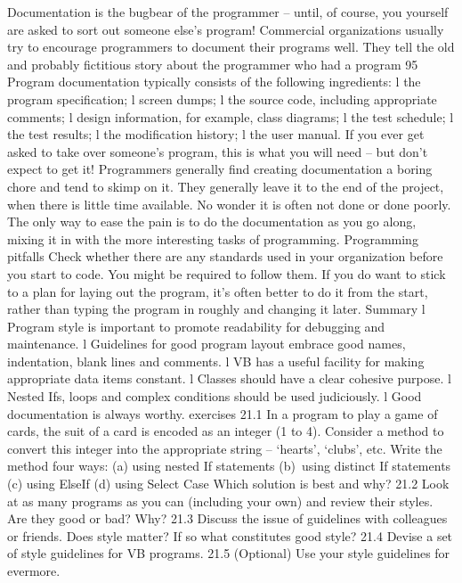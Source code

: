 Documentation is the bugbear of the programmer – until, of course, you yourself are asked to sort out someone else’s program! Commercial organizations usually try to encourage programmers to document their programs well. They tell the old and probably ﬁctitious story about the programmer who had a program 95%
Program documentation typically consists of the following ingredients:
l	the program speciﬁcation;
l	screen dumps;
l	the source code, including appropriate comments;
l	design information, for example, class diagrams;
l	the test schedule;
l	the test results;
l	the modiﬁcation history;
l	the user manual.
If you ever get asked to take over someone’s program, this is what you will need – but don’t expect to get it!
Programmers generally ﬁnd creating documentation a boring chore and tend to skimp on it. They generally leave it to the end of the project, when there is little time available. No wonder it is often not done or done poorly.
The only way to ease the pain is to do the documentation as you go along, mixing it in with the more interesting tasks of programming.
Programming pitfalls
Check whether there are any standards used in your organization before you start to code. You might be required to follow them. If you do want to stick to a plan for laying out the program, it’s often better to do it from the start, rather than typing the program in roughly and changing it later.
Summary
l	Program style is important to promote readability for debugging and 
maintenance.
l	Guidelines for good program layout embrace good names, indentation, blank lines and comments.
l	VB has a useful facility for making appropriate data items constant.
l	Classes should have a clear cohesive purpose.
l	Nested Ifs, loops and complex conditions should be used judiciously.
l	Good documentation is always worthy.
exercises
21.1	In a program to play a game of cards, the suit of a card is encoded as an integer 
(1 to 4). Consider a method to convert this integer into the appropriate string – ‘hearts’, ‘clubs’, etc. Write the method four ways:
	(a)	using nested If statements
	(b) using distinct If statements
	(c)	using ElseIf
	(d)	using Select Case
	Which solution is best and why?
21.2	Look at as many programs as you can (including your own) and review their styles. Are they good or bad? Why?
21.3	Discuss the issue of guidelines with colleagues or friends. Does style matter? If so what constitutes good style?
21.4	Devise a set of style guidelines for VB programs.
21.5	(Optional) Use your style guidelines for evermore.

